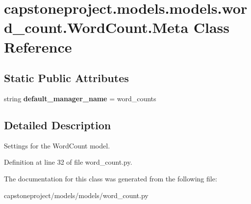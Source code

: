 \hypertarget{classcapstoneproject_1_1models_1_1models_1_1word__count_1_1_word_count_1_1_meta}{}\section{capstoneproject.\+models.\+models.\+word\+\_\+count.\+Word\+Count.\+Meta Class Reference}
\label{classcapstoneproject_1_1models_1_1models_1_1word__count_1_1_word_count_1_1_meta}
\subsection*{Static Public Attributes}
\begin{DoxyCompactItemize}
\item 
\mbox{\label{classcapstoneproject_1_1models_1_1models_1_1word__count_1_1_word_count_1_1_meta_aa6321990fb2ea2425e53bdfe22d45f67}} 
string {\bfseries default\+\_\+manager\+\_\+name} = \textquotesingle{}word\+\_\+counts\textquotesingle{}
\end{DoxyCompactItemize}


\subsection{Detailed Description}
\begin{DoxyVerb}Settings for the WordCount model.\end{DoxyVerb}
 

Definition at line 32 of file word\+\_\+count.\+py.



The documentation for this class was generated from the following file\+:\begin{DoxyCompactItemize}
\item 
capstoneproject/models/models/word\+\_\+count.\+py\end{DoxyCompactItemize}
